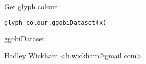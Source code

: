 \documentclass{article}
\begin{document}
\begin{Description}\relax
Get glyph colour
\end{Description}
\begin{Usage}
\begin{verbatim}glyph_colour.ggobiDataset(x)\end{verbatim}
\end{Usage}
\begin{Arguments}
\begin{ldescription}
\item[\code{x}] ggobiDataset
\end{ldescription}
\end{Arguments}
\begin{Details}\relax
\end{Details}
\begin{Author}\relax
Hadley Wickham <h.wickham@gmail.com>
\end{Author}
\begin{SeeAlso}\relax
{}
\end{SeeAlso}
\begin{Examples}
\begin{ExampleCode}\end{ExampleCode}
\end{Examples}
\end{document}
